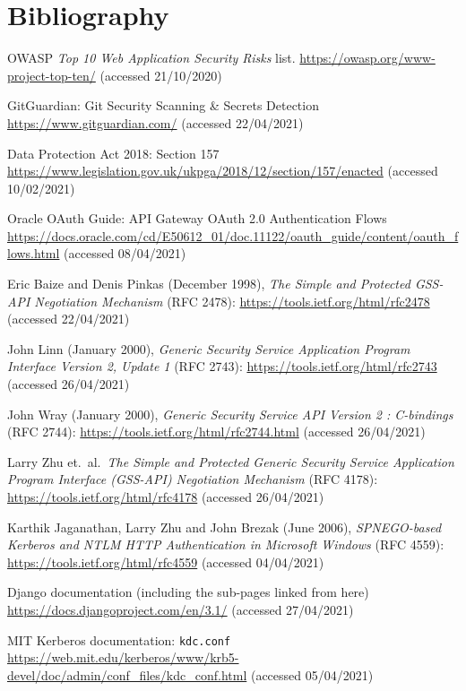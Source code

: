 \documentclass{article}
\begin{document}
\section*{Bibliography}
\begin{thebibliography}{9}
 OWASP \textit{Top 10 Web Application Security Risks} list. \url{https://owasp.org/www-project-top-ten/} (accessed 21/10/2020)

 GitGuardian: Git Security Scanning \& Secrets Detection \url{https://www.gitguardian.com/} (accessed 22/04/2021)

 Data Protection Act 2018: Section 157 \url{https://www.legislation.gov.uk/ukpga/2018/12/section/157/enacted} (accessed 10/02/2021)

 Oracle OAuth Guide: API Gateway OAuth 2.0 Authentication Flows \url{https://docs.oracle.com/cd/E50612_01/doc.11122/oauth_guide/content/oauth_flows.html} (accessed 08/04/2021)

 Eric Baize and Denis Pinkas (December 1998), \textit{The Simple and Protected GSS-API Negotiation Mechanism} (RFC 2478): \url{https://tools.ietf.org/html/rfc2478} (accessed 22/04/2021)

 John Linn (January 2000), \textit{Generic Security Service Application Program Interface Version 2, Update 1} (RFC 2743): \url{https://tools.ietf.org/html/rfc2743} (accessed 26/04/2021)

 John Wray (January 2000), \textit{Generic Security Service API Version 2 : C-bindings} (RFC 2744): \url{https://tools.ietf.org/html/rfc2744.html} (accessed 26/04/2021)

 Larry Zhu et.\ al.\ \textit{The Simple and Protected Generic Security Service Application Program Interface (GSS-API) Negotiation Mechanism} (RFC 4178): \url{https://tools.ietf.org/html/rfc4178} (accessed 26/04/2021)

 Karthik Jaganathan, Larry Zhu and John Brezak (June 2006), \textit{SPNEGO-based Kerberos and NTLM HTTP Authentication in Microsoft Windows} (RFC 4559): \url{https://tools.ietf.org/html/rfc4559} (accessed 04/04/2021)

 Django documentation (including the sub-pages linked from here) \url{https://docs.djangoproject.com/en/3.1/} (accessed 27/04/2021)

 MIT Kerberos documentation: \texttt{kdc.conf} \url{https://web.mit.edu/kerberos/www/krb5-devel/doc/admin/conf_files/kdc_conf.html} (accessed 05/04/2021)


\end{thebibliography}
\end{document}
